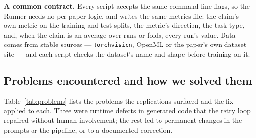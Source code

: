 \documentclass[10pt,twocolumn]{article}
\begin{document}
\textbf{A common contract.} Every script accepts the same command-line flags, so the Runner
needs no per-paper logic, and writes the same metrics file: the claim's own metric on the
training and test splits, the metric's direction, the task type, and, when the claim is an
average over runs or folds, every run's value. Data comes from stable sources ---
\texttt{torchvision}, OpenML or the paper's own dataset site --- and each script checks the
dataset's name and shape before training on it.

\subsection{Problems encountered and how we solved them}

Table~\ref{tab:problems} lists the problems the replications surfaced and the fix applied to
each. Three were runtime defects in generated code that the retry loop repaired without human
involvement; the rest led to permanent changes in the prompts or the pipeline, or to a
documented correction.
\end{document}
